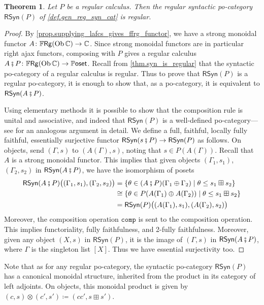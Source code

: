 \documentclass[11pt, oneside, article]{memoir}
\theoremstyle{plain}
\newtheorem{theorem}{Theorem}[chapter] %
\theoremstyle{definition}
\theoremstyle{remark}
\newcommand{\Set}[1]{\mathrm{#1}}%
\newcommand{\Cat}[1]{{\mathsf{#1}}}%
\newcommand{\CCat}[1]{\mathbb{\StrLeft{#1}{1}}\Cat{\StrGobbleLeft{#1}{1}}}%
\newcommand{\Funr}[1]{\mathsf{#1}}%
\DeclareMathOperator{\ob}{\Set{Ob}}
\newcommand{\cc}{\mathbb{C}}
\newcommand{\rsyn}{\Funr{RSyn}}
\newcommand{\comp}{\mathtt{comp}}
\newcommand{\abc}{P} %
\newcommand{\lint}{\mathbin{\oplus}} %
\newcommand{\cp}{\mathbin{\fatsemi}}
\newcommand{\types}{\Set{T}}
\newcommand{\pposet}{\CCat{Poset}}
\newcommand{\ffrg}[1][\types]{
  \ifthenelse{\equal{#1}{blank}}{\CCat{FRg}}{\CCat{FRg}(#1)}
}
\begin{document}
\begin{theorem}
Let $\abc$ be a regular calculus. Then the regular syntactic po-category $\rsyn(\abc)$ of \cref{def.gen_reg_syn_cat} is regular.
\end{theorem}
\begin{proof}[Proof]
By \cref{prop.supplying_lafcs_gives_ffrg_functor}, we have a strong monoidal functor $A\colon\ffrg[\ob\cc]\to\cc$. Since strong monoidal functors are in particular right ajax functors, composing with $\abc$ gives a regular calculus $A\cp\abc\colon \ffrg[\ob\cc] \to \pposet$. Recall from \cref{thm.syn_is_regular} that the syntactic po-category of a regular calculus is regular. Thus to prove that $\rsyn(\abc)$ is a regular po-category, it is enough to show that, as a po-category, it is equivalent to $\rsyn(A\cp\abc)$.

Using elementary methods it is possible to show that the composition rule is unital and associative, and indeed that $\rsyn(\abc)$ is a well-defined po-category---see \cite[Theorem~6.3]{fong2018graphical} for an analogous argument in detail. We define a full, faithful, locally fully faithful, essentially surjective functor $\rsyn(s\cp\abc) \to \rsyn(\abc)$ as follows. On objects, send $(\Gamma,s)$ to $(A(\Gamma),s)$, noting that $s \in P(A(\Gamma))$. Recall that $A$ is a strong monoidal functor. This implies that given objects $(\Gamma_1,s_1)$, $(\Gamma_2,s_2)$ in $\rsyn(A\cp\abc)$, we have the isomorphism of posets
\begin{align*}
	\rsyn(A\cp\abc)\big((\Gamma_1,s_1),(\Gamma_2,s_2)\big) 
	&= \{\theta \in (A\cp P)(\Gamma_1\lint \Gamma_2) \mid \theta \leq s_1\boxplus s_2\} \\
	&\cong \{\theta \in P(A(\Gamma_1)\lint A(\Gamma_2)) \mid \theta \leq s_1\boxplus s_2\} \\
	&= \rsyn(\abc)\big((A(\Gamma_1),s_1),(A(\Gamma_2),s_2)\big) 
\end{align*}
Moreover, the composition operation $\comp$ is sent to the composition operation. This implies functoriality, fully faithfulness, and 2-fully faithfulness. Moreover, given any object $(X,s)$ in $\rsyn(\abc)$, it is the image of $(\Gamma,s)$ in $\rsyn(A\cp\abc)$, where $\Gamma$ is the singleton list $[X]$. Thus we have essential surjectivity too.

\end{proof}

Note that as for any regular po-category, the syntactic po-category $\rsyn(\abc)$ has a canonical monoidal structure, inherited from the product in its category of left adjoints. On objects, this monoidal product is given by $(c,s) \otimes (c',s') \coloneqq (cc',s\boxplus s')$.
\end{document}
